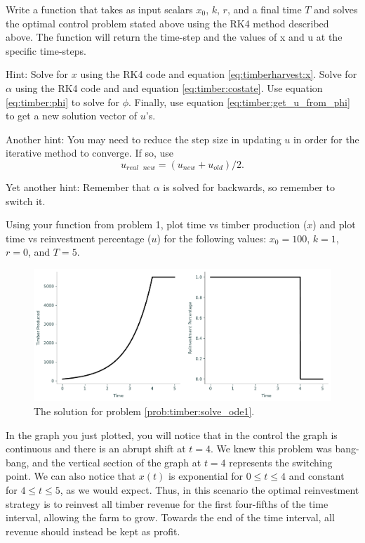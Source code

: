 \begin{problem}
Write a function that takes as input scalars $x_{0}$, $k$, $r$, and a final time $T$ and solves the optimal control problem stated above using the RK4 method described above. The function will return the time-step and the values of x and u at the specific time-steps. 

Hint: Solve for $x$ using the RK4 code and equation \eqref{eq:timberharvest:x}. Solve for $\alpha$ using the RK4 code and and equation \eqref{eq:timber:costate}. Use equation \eqref{eq:timber:phi} to solve for $\phi$. Finally, use equation \eqref{eq:timber:get_u_from_phi} to get a new solution vector of $u$'s.

Another hint: You may need to reduce the step size in updating $u$ in order for the iterative method to converge. If so, use 
\[u_{real\text{ }new} = (u_{new} + u_{old}) / 2.\]

Yet another hint: Remember that $\alpha$ is solved for backwards, so remember to switch it.

\end{problem}

\begin{problem}
\label{prob:timber:solve_ode1}
Using your function from problem 1, plot time vs timber production ($x$) and plot time vs reinvestment percentage ($u$) for the following values: $x_{0} = 100$, $k = 1$, $r = 0$, and $T = 5$.

\end{problem}
\begin{figure}[H]
\includegraphics[width=\textwidth]{figures/Example_problem2.pdf}
\caption{The solution for problem \ref{prob:timber:solve_ode1}.}
\end{figure}

In the graph you just plotted, you will notice that in the control the graph is continuous and there is an abrupt shift at $t = 4$. 
We knew this problem was bang-bang, and the vertical section of the graph at $t = 4$ represents the switching point. 
We can also notice that $x(t)$ is exponential for $0 \leq t \leq 4$ and constant for $4 \leq t \leq 5$, as we would expect. 
Thus, in this scenario the optimal reinvestment strategy is to reinvest all timber revenue for the first four-fifths of the time interval, allowing the farm to grow. Towards the end of the time interval, all revenue should instead be kept as profit.

